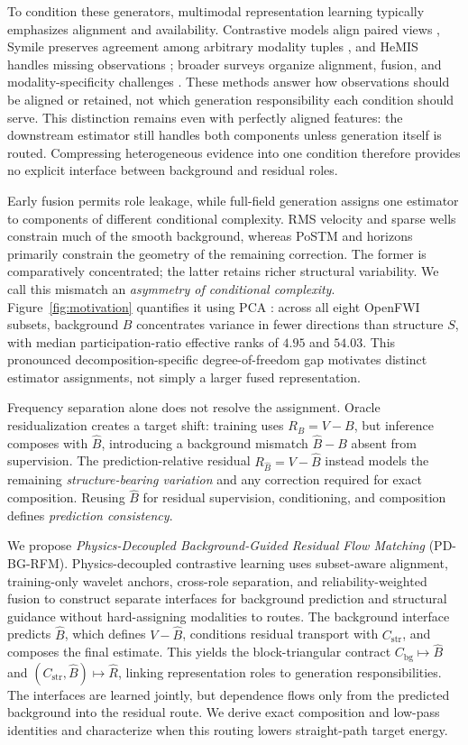 \documentclass[letterpaper]{article}
\begin{document}
To condition these generators, multimodal representation learning typically emphasizes alignment and availability. Contrastive models align paired views \cite{tian2020cmc,radford2021clip}, Symile preserves agreement among arbitrary modality tuples \cite{saporta2024symile}, and HeMIS handles missing observations \cite{havaei2016hemis}; broader surveys organize alignment, fusion, and modality-specificity challenges \cite{baltrusaitis2019multimodal}. These methods answer how observations should be aligned or retained, not which generation responsibility each condition should serve. This distinction remains even with perfectly aligned features: the downstream estimator still handles both components unless generation itself is routed. Compressing heterogeneous evidence into one condition therefore provides no explicit interface between background and residual roles.

Early fusion permits role leakage, while full-field generation assigns one estimator to components of different conditional complexity. RMS velocity and sparse wells constrain much of the smooth background, whereas PoSTM and horizons primarily constrain the geometry of the remaining correction. The former is comparatively concentrated; the latter retains richer structural variability. We call this mismatch an \emph{asymmetry of conditional complexity}. Figure~\ref{fig:motivation} quantifies it using PCA \cite{jolliffe2002pca}: across all eight OpenFWI subsets, background $B$ concentrates variance in fewer directions than structure $S$, with median participation-ratio effective ranks of $4.95$ and $54.03$. This pronounced decomposition-specific degree-of-freedom gap motivates distinct estimator assignments, not simply a larger fused representation.

Frequency separation alone does not resolve the assignment. Oracle residualization creates a target shift: training uses $R_B=V-B$, but inference composes with $\hat B$, introducing a background mismatch $\hat B-B$ absent from supervision. The prediction-relative residual $R_{\hat B}=V-\hat B$ instead models the remaining \emph{structure-bearing variation} and any correction required for exact composition. Reusing $\hat B$ for residual supervision, conditioning, and composition defines \emph{prediction consistency}.

We propose \emph{Physics-Decoupled Background-Guided Residual Flow Matching} (PD-BG-RFM). Physics-decoupled contrastive learning uses subset-aware alignment, training-only wavelet anchors, cross-role separation, and reliability-weighted fusion to construct separate interfaces for background prediction and structural guidance without hard-assigning modalities to routes. The background interface predicts $\hat B$, which defines $V-\hat B$, conditions residual transport with $C_{\mathrm{str}}$, and composes the final estimate. This yields the block-triangular contract $C_{\mathrm{bg}}\mapsto\hat B$ and $(C_{\mathrm{str}},\hat B)\mapsto\hat R$, linking representation roles to generation responsibilities. The interfaces are learned jointly, but dependence flows only from the predicted background into the residual route. We derive exact composition and low-pass identities and characterize when this routing lowers straight-path target energy.
\end{document}
